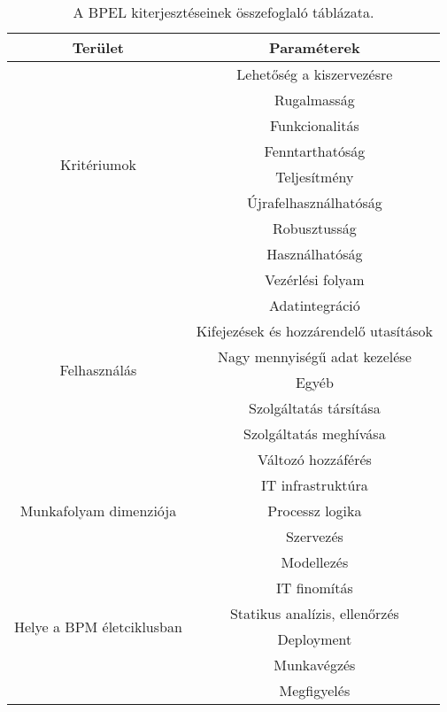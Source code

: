 \begin{table}[h!]
\centering
\caption{A BPEL kiterjesztéseinek összefoglaló táblázata.}
\label{tab:bpel_characteristics}
\begin{tabular}{|c|c|}
\hline
\textbf{Terület} & \textbf{Paraméterek}\\
\hline
\multirow{8}{7em}{Kritériumok} & Lehetőség a kiszervezésre\\
& Rugalmasság\\
& Funkcionalitás\\
& Fenntarthatóság\\
& Teljesítmény\\
& Újrafelhasználhatóság\\
& Robusztusság\\
& Használhatóság\\
\hline
\multirow{8}{7em}{Felhasználás} & Vezérlési folyam\\
& Adatintegráció\\
& Kifejezések és hozzárendelő utasítások\\
& Nagy mennyiségű adat kezelése\\
& Egyéb \\
& Szolgáltatás társítása\\
& Szolgáltatás meghívása\\
& Változó hozzáférés\\
\hline
\multirow{3}{7em}{Munkafolyam dimenziója} & IT infrastruktúra\\
& Processz logika\\
& Szervezés\\
\hline
\multirow{6}{7em}{Helye a BPM életciklusban} & Modellezés\\
& IT finomítás\\
& Statikus analízis, ellenőrzés\\
& Deployment\\
& Munkavégzés\\
& Megfigyelés\\
\hline
\end{tabular}
\end{table}

